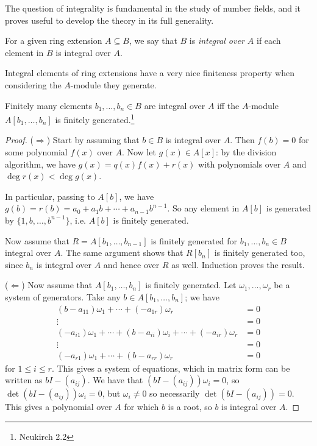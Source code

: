 The question of integrality is fundamental in the study of number fields, and it proves useful to develop the theory in its full generality.

For a given ring extension $A\subseteq B$, we say that $B$ is \emph{integral over $A$} if each element in $B$ is integral over $A$.

Integral elements of ring extensions have a very nice finiteness property when considering the $A$-module they generate.

\begin{proposition}
	Finitely many elements $b_1,\dots,b_n\in B$ are integral over $A$ iff the $A$-module $A[b_1,\dots,b_n]$ is finitely generated.\footnote{Neukirch 2.2}
\end{proposition}
\begin{proof}
	($\Longrightarrow$) Start by assuming that $b\in B$ is integral over $A$. Then $f(b)=0$ for some polynomial $f(x)$ over $A$. Now let $g(x)\in A[x]$: by the division algorithm, we have $g(x)=q(x)f(x)+r(x)$ with polynomials over $A$ and $\deg r(x) < \deg g(x)$.

	In particular, passing to $A[b]$, we have $g(b)=r(b)=a_0+a_1b+\cdots+a_{n-1}b^{n-1}$. So any element in $A[b]$ is generated by $\{1,b,\dots,b^{n-1}\}$, i.e. $A[b]$ is finitely generated.

	Now assume that $R=A[b_1,\dots,b_{n-1}]$ is finitely generated for $b_1,\dots,b_n\in B$ integral over $A$. The same argument shows that $R[b_n]$ is finitely generated too, since $b_n$ is integral over $A$ and hence over $R$ as well. Induction proves the result.

	($\Longleftarrow$) Now assume that $A[b_1,\dots,b_n]$ is finitely generated. Let $\omega_1,\dots,\omega_r$ be a system of generators. Take any $b\in A[b_1,\dots,b_n]$; we have
	\begin{align*}
		(b-a_{11})\omega_1 + \cdots + (-a_{1r})\omega_r &= 0\\
		\vdots &= 0\\
		(-a_{i1})\omega_1 + \cdots + (b-a_{ii})\omega_i + \cdots + (-a_{ir})\omega_r&=0\\
		\vdots &= 0\\
		(-a_{r1})\omega_1 + \cdots + (b-a_{rr})\omega_r &= 0
	\end{align*}
	for $1\leq i\leq r$. This gives a system of equations, which in matrix form can be written as $bI - (a_{ij})$. We have that $(bI-(a_{ij}))\omega_i = 0$, so $\det(bI-(a_{ij}))\omega_i = 0$, but $\omega_i\neq 0$ so necessarily $\det(bI-(a_{ij}))=0$. This gives a polynomial over $A$ for which $b$ is a root, so $b$ is integral over $A$.
\end{proof}

